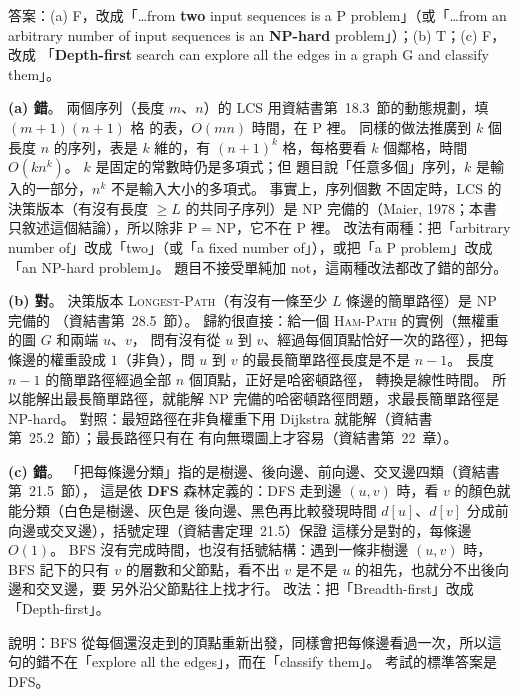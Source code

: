 \begin{pastsoln}
答案：(a) F，改成「…from \textbf{two} input sequences is a P problem」（或「…from an arbitrary
number of input sequences is an \textbf{NP-hard} problem」）；(b) T；(c) F，改成
「\textbf{Depth-first} search can explore all the edges in a graph G and classify them」。

\textbf{(a) 錯}。 兩個序列（長度 $m$、$n$）的 LCS 用資結書第~18.3~節的動態規劃，填 $(m+1)(n+1)$ 格
的表，$O(mn)$ 時間，在 P 裡。 同樣的做法推廣到 $k$ 個長度 $n$ 的序列，表是 $k$ 維的，有
$(n+1)^k$ 格，每格要看 $k$ 個鄰格，時間 $O(k n^k)$。 $k$ 是固定的常數時仍是多項式；但
題目說「任意多個」序列，$k$ 是輸入的一部分，$n^k$ 不是輸入大小的多項式。 事實上，序列個數
不固定時，LCS 的決策版本（有沒有長度 $\ge L$ 的共同子序列）是 NP 完備的（Maier, 1978；本書
只敘述這個結論），所以除非 $\mathrm{P} = \mathrm{NP}$，它不在 P 裡。 改法有兩種：把「arbitrary
number of」改成「two」（或「a fixed number of」），或把「a P problem」改成「an NP-hard
problem」。 題目不接受單純加 not，這兩種改法都改了錯的部分。

\textbf{(b) 對}。 決策版本 \textsc{Longest-Path}（有沒有一條至少 $L$ 條邊的簡單路徑）是 NP 完備的
（資結書第~28.5~節）。 歸約很直接：給一個 \textsc{Ham-Path} 的實例（無權重的圖 $G$ 和兩端 $u$、$v$，
問有沒有從 $u$ 到 $v$、經過每個頂點恰好一次的路徑），把每條邊的權重設成 $1$（非負），問 $u$ 到 $v$
的最長簡單路徑長度是不是 $n - 1$。 長度 $n - 1$ 的簡單路徑經過全部 $n$ 個頂點，正好是哈密頓路徑，
轉換是線性時間。 所以能解出最長簡單路徑，就能解 NP 完備的哈密頓路徑問題，求最長簡單路徑是
NP-hard。 對照：最短路徑在非負權重下用 Dijkstra 就能解（資結書第~25.2~節）；最長路徑只有在
有向無環圖上才容易（資結書第~22~章）。

\textbf{(c) 錯}。 「把每條邊分類」指的是樹邊、後向邊、前向邊、交叉邊四類（資結書第~21.5~節），
這是依 \textbf{DFS} 森林定義的：DFS 走到邊 $(u, v)$ 時，看 $v$ 的顏色就能分類（白色是樹邊、灰色是
後向邊、黑色再比較發現時間 $d[u]$、$d[v]$ 分成前向邊或交叉邊），括號定理（資結書定理~21.5）保證
這樣分是對的，每條邊 $O(1)$。 BFS 沒有完成時間，也沒有括號結構：遇到一條非樹邊 $(u, v)$ 時，
BFS 記下的只有 $v$ 的層數和父節點，看不出 $v$ 是不是 $u$ 的祖先，也就分不出後向邊和交叉邊，要
另外沿父節點往上找才行。 改法：把「Breadth-first」改成「Depth-first」。

說明：BFS 從每個還沒走到的頂點重新出發，同樣會把每條邊看過一次，所以這句的錯不在「explore
all the edges」，而在「classify them」。 考試的標準答案是 DFS。
\end{pastsoln}
